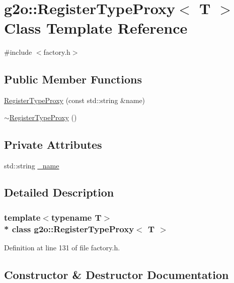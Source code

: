 \hypertarget{classg2o_1_1RegisterTypeProxy}{}\section{g2o\+:\+:Register\+Type\+Proxy$<$ T $>$ Class Template Reference}
\label{classg2o_1_1RegisterTypeProxy}


{\ttfamily \#include $<$factory.\+h$>$}

\subsection*{Public Member Functions}
\begin{DoxyCompactItemize}
\item 
\hyperlink{classg2o_1_1RegisterTypeProxy_a179d0d498d8a53f9432d1635019705f5}{Register\+Type\+Proxy} (const std\+::string \&name)
\item 
\hyperlink{classg2o_1_1RegisterTypeProxy_ab8469d11a8e3548e74b1de4b3a332d4e}{$\sim$\+Register\+Type\+Proxy} ()
\end{DoxyCompactItemize}
\subsection*{Private Attributes}
\begin{DoxyCompactItemize}
\item 
std\+::string \hyperlink{classg2o_1_1RegisterTypeProxy_a34c9e807a21fc0dbafd8980c17bf77f9}{\+\_\+name}
\end{DoxyCompactItemize}


\subsection{Detailed Description}
\subsubsection*{template$<$typename T$>$\\*
class g2o\+::\+Register\+Type\+Proxy$<$ T $>$}



Definition at line 131 of file factory.\+h.



\subsection{Constructor \& Destructor Documentation}
